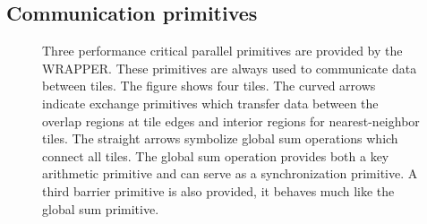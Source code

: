 \subsection{Communication primitives}
\label{sect:communication_primitives}

\begin{figure}
\begin{center}
\end{center}
\caption{Three performance critical parallel primitives are provided
by the WRAPPER. These primitives are always used to communicate data
between tiles. The figure shows four tiles. The curved arrows indicate
exchange primitives which transfer data between the overlap regions at tile
edges and interior regions for nearest-neighbor tiles.
The straight arrows symbolize global sum operations which connect all tiles.
The global sum operation provides both a key arithmetic primitive and can
serve as a synchronization primitive. A third barrier primitive is also
provided, it behaves much like the global sum primitive.
} \label{fig:communication_primitives}
\end{figure}


